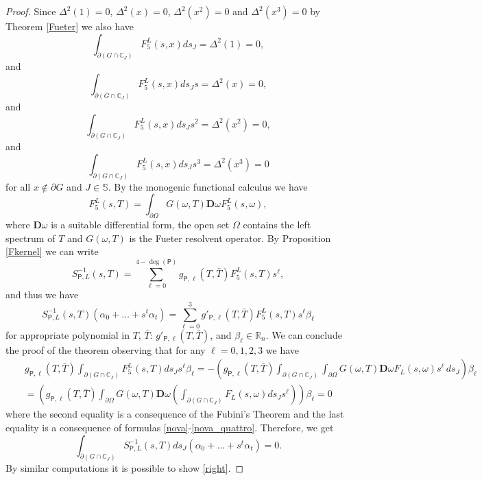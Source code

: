\documentclass[reqno,11pt]{amsart}
\numberwithin{equation}{section}
\theoremstyle{definition}
\begin{document}
\begin{proof}
	Since $\Delta^2(1)=0$, $\Delta^2(x)=0$, $\Delta^2(x^2)=0$ and $\Delta^2(x^3)=0$ by Theorem \ref{Fueter} we also have
	\begin{equation}\label{nova}
		\int_{\partial{(G \cap \mathbb{C}_J)}} F_5^L(s,x) ds_J=\Delta^2(1)=0,
	\end{equation}
	and
	\begin{equation}\label{nova_bis}
		\int_{\partial{(G \cap \mathbb{C}_J)}} F_5^L(s,x) ds_Js =\Delta^2(x)=0,
	\end{equation}
	and
	\begin{equation}\label{nova_tris}
		\int_{\partial{(G \cap \mathbb{C}_J)}} F_5^L(s,x) ds_Js^2 =\Delta^2(x^2)=0,
	\end{equation}
	and
	\begin{equation}\label{nova_quattro}
		\int_{\partial{(G \cap \mathbb{C}_J)}} F_5^L(s,x) ds_Js^3 =\Delta^2(x^3)=0
	\end{equation}
	for all $x \notin \partial G$ and $J \in \mathbb{S}$. By the monogenic functional calculus \cite{J, JM} we have
	$$ F^L_5(s,T)= \int_{\partial \Omega} G(\omega,T) \mathbf{D}\omega F^L_5(s,\omega),$$
	where $\mathbf{D}\omega$ is a suitable differential form, the open set $ \Omega$ contains the left spectrum of $T$ and $G(\omega,T)$ is the Fueter resolvent operator. By Proposition \ref{Fkernel} we can write
	$$S^{-1}_{\mathsf P,L}(s,T)=\sum_{\ell=0}^{4-\operatorname{deg}(\mathsf P)} g_{\mathsf P,\ell}(T,\bar T)F^L_5(s,T) s^{\ell},$$
	and thus we have
	$$S^{-1}_{\mathsf P,L}(s,T) (\alpha_0+\dots+ s^t\alpha_t) =\sum_{\ell=0}^{3} g'_{\mathsf P,\ell}(T,\bar T)F^L_5(s,T) s^{\ell}\beta_\ell$$
	for appropriate polynomial in $T, \, \bar T$: $g'_{\mathsf P,\ell}(T,\bar T)$, and $\beta_{\ell}\in\mathbb R_n$. We can conclude the proof of the theorem observing that for any $\ell=0,1,2,3$ we have
	\begin{eqnarray*}
		&& g_{\mathsf P,\ell}(T,\bar T) \int_{\partial{(G \cap \mathbb{C}_J)}}  F^L_5(s,T) ds_J s^\ell \beta_\ell=- \left(g_{\mathsf P,\ell}(T,\bar T) \int_{\partial{(G \cap \mathbb{C}_J)}}  \int_{\partial\Omega} G(\omega, T)\mathbf{D}\omega F_L(s,\omega)s^{\ell}\, ds_J \right)\beta_\ell\\
		&&=\left( g_{\mathsf P,\ell}(T,\bar T) \int_{\partial \Omega} G(\omega,T) \mathbf{D}\omega \left(\int_{\partial{(G \cap \mathbb{C}_J)}} F_L(s,\omega) ds_J s^\ell \right)\right)\beta_\ell= 0
	\end{eqnarray*}
	where the second equality is a consequence of the Fubini's Theorem and the last equality is a consequence of formulas \eqref{nova}-\eqref{nova_quattro}. Therefore, we get
$$	\int_{\partial{(G \cap \mathbb{C}_J)}} S^{-1}_{\mathsf P,L}(s,T) ds_J (\alpha_0+\dots+ s^t\alpha_t)=0.	$$
By similar computations it is possible to show \eqref{right}.
\end{proof}
\end{document}
